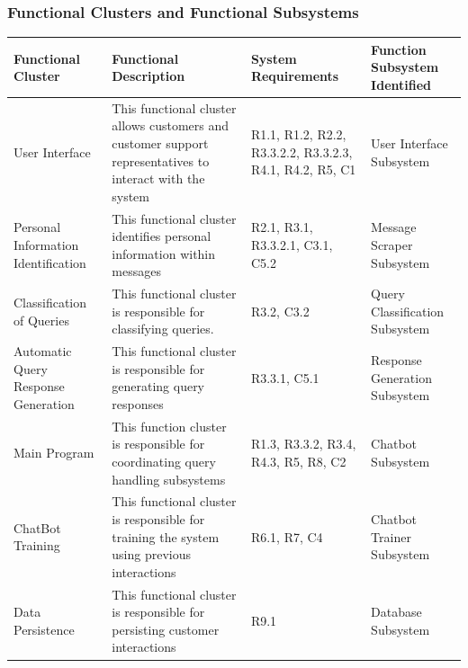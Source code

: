 \documentclass[11pt]{article}
\begin{document}
\subsubsection{Functional Clusters and Functional Subsystems}
\begin{center}
	\hspace*{-1.5cm}\begin{tabular}{|p{4cm}|p{7cm}|p{3cm}|p{5cm}|}
		\hline
		Functional Cluster & Functional Description & System Requirements & Function Subsystem Identified \\
		\hline
		User Interface & This functional cluster allows customers and customer support representatives to interact with the system & R1.1, R1.2, R2.2, R3.3.2.2, R3.3.2.3, R4.1, R4.2, R5, C1 & User Interface Subsystem \\
		\hline 
		Personal Information Identification & This functional cluster identifies personal information within messages & R2.1, R3.1, R3.3.2.1, C3.1, C5.2 & Message Scraper Subsystem \\
		\hline
		Classification of Queries & This functional cluster is responsible for classifying queries. & R3.2, C3.2 & Query Classification Subsystem \\
		\hline
		Automatic Query Response Generation & This functional cluster is responsible for generating query responses & R3.3.1, C5.1 & Response Generation Subsystem \\
		\hline
		Main Program & This function cluster is responsible for coordinating query handling subsystems & R1.3, R3.3.2, R3.4, R4.3, R5, R8, C2 & Chatbot Subsystem \\
		\hline
		ChatBot Training & This functional cluster is responsible for training the system using previous interactions & R6.1, R7, C4 & Chatbot Trainer Subsystem \\
		\hline
		 Data Persistence & This functional cluster is responsible for persisting customer interactions & R9.1 & Database Subsystem \\
		\hline
	\end{tabular}
\end{center}
\end{document}
